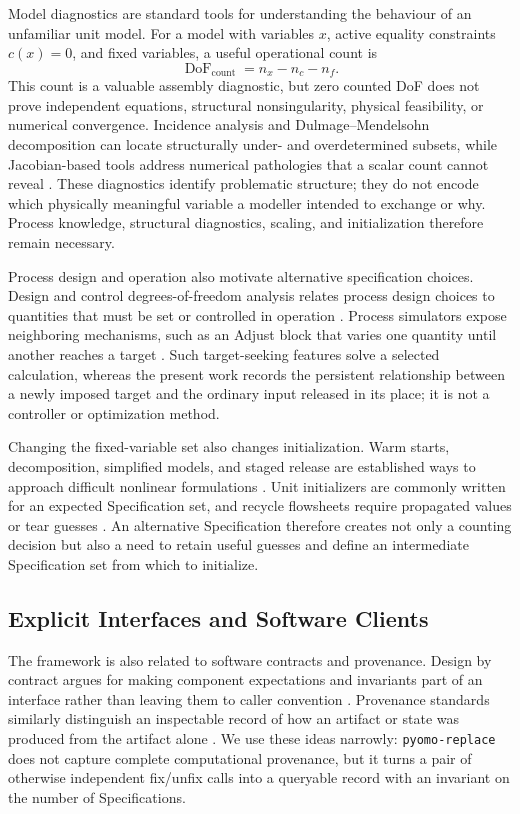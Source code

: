 \documentclass[10pt,letterpaper]{article}
\begin{document}
Model diagnostics are standard tools for understanding the behaviour of an unfamiliar unit model. For a model with variables $x$, active equality constraints $c(x)=0$, and fixed variables, a useful operational count is
\begin{equation}
  \operatorname{DoF}_{\mathrm{count}} = n_x - n_c - n_f.
\end{equation}
This count is a valuable assembly diagnostic, but zero counted DoF does not prove independent equations, structural nonsingularity, physical feasibility, or numerical convergence. Incidence analysis and Dulmage--Mendelsohn decomposition can locate structurally under- and overdetermined subsets, while Jacobian-based tools address numerical pathologies that a scalar count cannot reveal \cite{bunus2001debugging,parker2023dulmage,lee2024model,allan2025jacobian}. These diagnostics identify problematic structure; they do not encode which physically meaningful variable a modeller intended to exchange or why. Process knowledge, structural diagnostics, scaling, and initialization therefore remain necessary.

Process design and operation also motivate alternative specification choices. Design and control degrees-of-freedom analysis relates process design choices to quantities that must be set or controlled in operation \cite{luyben1996design}. Process simulators expose neighboring mechanisms, such as an Adjust block that varies one quantity until another reaches a target \cite{dwsimAdjust}. Such target-seeking features solve a selected calculation, whereas the present work records the persistent relationship between a newly imposed target and the ordinary input released in its place; it is not a controller or optimization method.

Changing the fixed-variable set also changes initialization. Warm starts, decomposition, simplified models, and staged release are established ways to approach difficult nonlinear formulations \cite{SAFDARNEJAD201539,dowling2015framework}. Unit initializers are commonly written for an expected Specification set, and recycle flowsheets require propagated values or tear guesses \cite{lee2021idaes,pyomoNetworkDocs}. An alternative Specification therefore creates not only a counting decision but also a need to retain useful guesses and define an intermediate Specification set from which to initialize.

\subsection{Explicit Interfaces and Software Clients}
The framework is also related to software contracts and provenance. Design by contract argues for making component expectations and invariants part of an interface rather than leaving them to caller convention \cite{meyer1997object}. Provenance standards similarly distinguish an inspectable record of how an artifact or state was produced from the artifact alone \cite{w3cProvOverview}. We use these ideas narrowly: \texttt{pyomo-replace} does not capture complete computational provenance, but it turns a pair of otherwise independent fix/unfix calls into a queryable record with an invariant on the number of Specifications.
\end{document}
